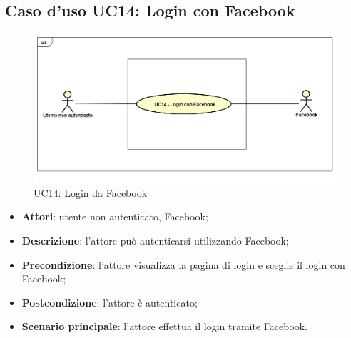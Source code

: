 \newpage
\subsection{Caso d'uso UC14: Login con Facebook}
\label{UC14}
\begin{figure}[ht]
	\centering
	\includegraphics[scale=0.48]{UML/UC14.png}
	\caption{UC14: Login da Facebook}
\end{figure}
\FloatBarrier
\begin{itemize}
	\item \textbf{Attori}: utente non autenticato, Facebook;
	\item \textbf{Descrizione}: l'attore può autenticarsi utilizzando Facebook;
	\item \textbf{Precondizione}: l'attore visualizza la pagina di login e sceglie il login con Facebook;
	\item \textbf{Postcondizione}: l'attore è autenticato;
	\item \textbf{Scenario principale}: l'attore effettua il login tramite Facebook.
\end{itemize}
